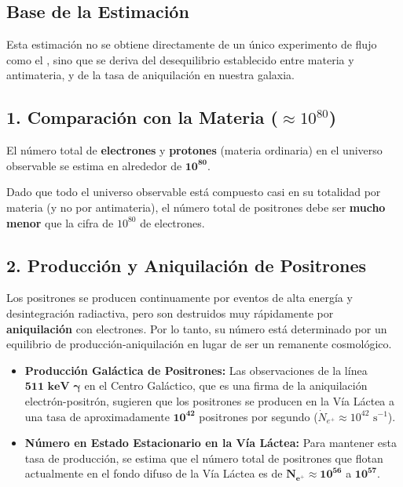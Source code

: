 \documentclass[11pt,a4paper]{book}
\begin{document}
\subsection*{Base de la Estimación}

Esta estimación no se obtiene directamente de un único experimento de flujo como el , sino que se deriva del desequilibrio establecido entre materia y antimateria, y de la tasa de aniquilación en nuestra galaxia.

\subsection*{1. Comparación con la Materia ($\approx 10^{80}$)}

El número total de \textbf{electrones} y \textbf{protones} (materia ordinaria) en el universo observable se estima en alrededor de $\mathbf{10^{80}}$.

Dado que todo el universo observable está compuesto casi en su totalidad por materia (y no por antimateria), el número total de positrones debe ser \textbf{mucho menor} que la cifra de $10^{80}$ de electrones.

\subsection*{2. Producción y Aniquilación de Positrones}

Los positrones se producen continuamente por eventos de alta energía y desintegración radiactiva, pero son destruidos muy rápidamente por \textbf{aniquilación} con electrones. Por lo tanto, su número está determinado por un equilibrio de producción-aniquilación en lugar de ser un remanente cosmológico.

\begin{itemize}
    \item \textbf{Producción Galáctica de Positrones:} Las observaciones de la línea $\mathbf{511 \text{ keV } \gamma}$ en el Centro Galáctico, que es una firma de la aniquilación electrón-positrón, sugieren que los positrones se producen en la Vía Láctea a una tasa de aproximadamente $\mathbf{10^{42}}$ positrones por segundo ($\dot{N}_{e^+} \approx 10^{42} \text{ s}^{-1}$).
    \item \textbf{Número en Estado Estacionario en la Vía Láctea:} Para mantener esta tasa de producción, se estima que el número total de positrones que flotan actualmente en el fondo difuso de la Vía Láctea es de $\mathbf{N_{e^+} \approx 10^{56}}$ a $\mathbf{10^{57}}$.
\end{itemize}
\end{document}
